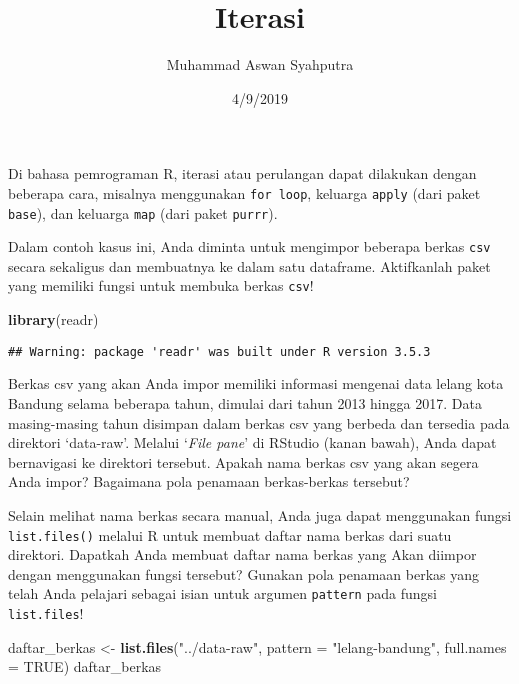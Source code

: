 \documentclass[]{article}
\title{Iterasi}
\author{Muhammad Aswan Syahputra}
\date{4/9/2019}
\newenvironment{Shaded}{\begin{snugshade}}{\end{snugshade}}
\newcommand{\DataTypeTok}[1]{\textcolor[rgb]{0.13,0.29,0.53}{#1}}
\newcommand{\KeywordTok}[1]{\textcolor[rgb]{0.13,0.29,0.53}{\textbf{#1}}}
\newcommand{\NormalTok}[1]{#1}
\newcommand{\OtherTok}[1]{\textcolor[rgb]{0.56,0.35,0.01}{#1}}
\newcommand{\StringTok}[1]{\textcolor[rgb]{0.31,0.60,0.02}{#1}}
\begin{document}
\maketitle

{
\setcounter{tocdepth}{2}
\tableofcontents
}
Di bahasa pemrograman R, iterasi atau perulangan dapat dilakukan dengan
beberapa cara, misalnya menggunakan \texttt{for\ loop}, keluarga
\texttt{apply} (dari paket \texttt{base}), dan keluarga \texttt{map}
(dari paket \texttt{purrr}).

Dalam contoh kasus ini, Anda diminta untuk mengimpor beberapa berkas
\texttt{csv} secara sekaligus dan membuatnya ke dalam satu dataframe.
Aktifkanlah paket yang memiliki fungsi untuk membuka berkas
\texttt{csv}!

\begin{Shaded}
\begin{Highlighting}[]
\KeywordTok{library}\NormalTok{(readr)}
\end{Highlighting}
\end{Shaded}

\begin{verbatim}
## Warning: package 'readr' was built under R version 3.5.3
\end{verbatim}

Berkas csv yang akan Anda impor memiliki informasi mengenai data lelang
kota Bandung selama beberapa tahun, dimulai dari tahun 2013 hingga 2017.
Data masing-masing tahun disimpan dalam berkas csv yang berbeda dan
tersedia pada direktori `data-raw'. Melalui `\emph{File pane}' di
RStudio (kanan bawah), Anda dapat bernavigasi ke direktori tersebut.
Apakah nama berkas csv yang akan segera Anda impor? Bagaimana pola
penamaan berkas-berkas tersebut?

Selain melihat nama berkas secara manual, Anda juga dapat menggunakan
fungsi \texttt{list.files()} melalui R untuk membuat daftar nama berkas
dari suatu direktori. Dapatkah Anda membuat daftar nama berkas yang Akan
diimpor dengan menggunakan fungsi tersebut? Gunakan pola penamaan berkas
yang telah Anda pelajari sebagai isian untuk argumen \texttt{pattern}
pada fungsi \texttt{list.files}!

\begin{Shaded}
\begin{Highlighting}[]
\NormalTok{daftar_berkas <-}\StringTok{ }\KeywordTok{list.files}\NormalTok{(}\StringTok{"../data-raw"}\NormalTok{, }\DataTypeTok{pattern =} \StringTok{"lelang-bandung"}\NormalTok{, }\DataTypeTok{full.names =} \OtherTok{TRUE}\NormalTok{)}
\NormalTok{daftar_berkas}
\end{Highlighting}
\end{Shaded}
\end{document}

